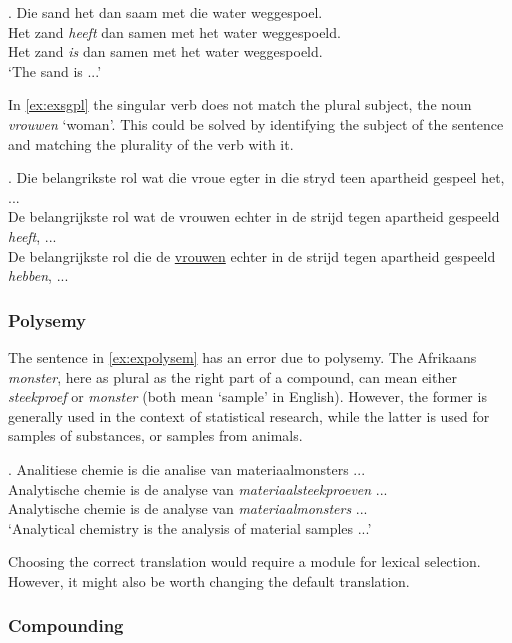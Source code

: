 \documentclass[11pt]{article}
\begin{document}
\ex. \label{ex:exsgpl} 
    Die sand het dan saam met die water weggespoel. \\
    Het zand {\em heeft} dan samen met het water weggespoeld. \\
    Het zand {\em is} dan samen met het water weggespoeld. \\
   `The sand is ...'

In \ref{ex:exsgpl} the singular verb does not match the plural subject, the noun {\em vrouwen} `woman'. This 
could be solved by identifying the subject of the sentence and matching the plurality 
of the verb with it.

\ex. \label{ex:exsgpl} 
    Die belangrikste rol wat die vroue egter in die stryd teen apartheid gespeel het, ... \\
    De belangrijkste rol wat de vrouwen echter in de strijd tegen apartheid gespeeld {\em heeft}, ... \\
    De belangrijkste rol die de \underline{vrouwen} echter in de strijd tegen apartheid gespeeld {\em hebben}, ... \\

\subsubsection{Polysemy}

The sentence in \ref{ex:expolysem} has an error due to polysemy. The Afrikaans {\em monster}, here 
as plural as the right part of a compound, can mean either {\em steekproef} or {\em monster} (both 
mean `sample' in English). However, the former is generally used in the context of statistical 
research, while the latter is used for samples of substances, or samples from animals. 

\ex. \label{ex:expolysem} 
    Analitiese chemie is die analise van materiaalmonsters ... \\
    Analytische chemie is de analyse van {\em materiaalsteekproeven} ... \\
    Analytische chemie is de analyse van {\em materiaalmonsters} ... \\
   `Analytical chemistry is the analysis of material samples ...'

Choosing the correct translation would require a module for lexical selection. However, it might also
be worth changing the default translation.

\subsubsection{Compounding}
\end{document}
